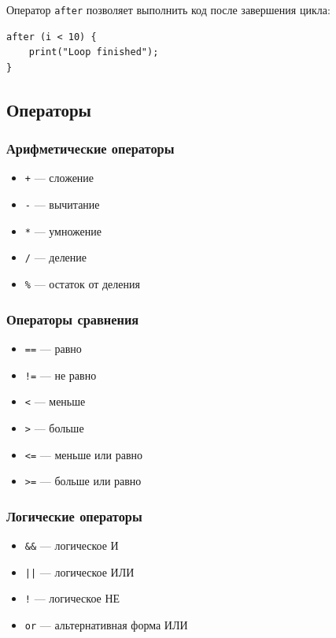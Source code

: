 \documentclass[12pt,a4paper]{article}
\begin{document}
Оператор \texttt{after} позволяет выполнить код после завершения цикла:

\begin{lstlisting}
after (i < 10) {
    print("Loop finished");
}
\end{lstlisting}

\subsection{Операторы}

\subsubsection{Арифметические операторы}

\begin{itemize}
    \item \texttt{+} --- сложение
    \item \texttt{-} --- вычитание
    \item \texttt{*} --- умножение
    \item \texttt{/} --- деление
    \item \texttt{\%} --- остаток от деления
\end{itemize}

\subsubsection{Операторы сравнения}

\begin{itemize}
    \item \texttt{==} --- равно
    \item \texttt{!=} --- не равно
    \item \texttt{<} --- меньше
    \item \texttt{>} --- больше
    \item \texttt{<=} --- меньше или равно
    \item \texttt{>=} --- больше или равно
\end{itemize}

\subsubsection{Логические операторы}

\begin{itemize}
    \item \texttt{\&\&} --- логическое И
    \item \texttt{||} --- логическое ИЛИ
    \item \texttt{!} --- логическое НЕ
    \item \texttt{or} --- альтернативная форма ИЛИ
\end{itemize}
\end{document}
